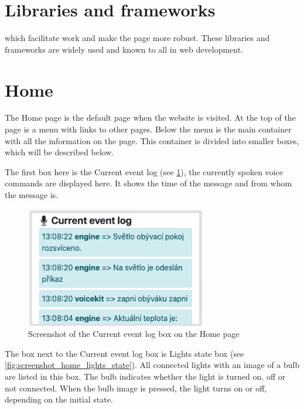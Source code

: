 \section{Libraries and frameworks} \label{section:libraries_and_frameworks}

which facilitate work and make the page more robust. These libraries and frameworks are widely used and known to all in web development. 


\section{Home}

The Home page is the default page when the website is visited. At the top of the page is a menu with links to other pages. Below the menu is the main container with all the information on the page. This container is divided into smaller boxes, which will be described below.


The first box here is the Current event log (see \cref{fig:screenshot_home_current_event_log}), the currently spoken voice commands are displayed here. It shows the time of the message and from whom the message is. 

\begin{figure}[H]
    \centering
    \includegraphics[width=0.7\textwidth]{img/screenshot_home_current_event_log.png}
    \caption{Screenshot of the Current event log box on the Home page}
    \label{fig:screenshot_home_current_event_log}
\end{figure}

The box next to the Current event log box is Lights state box (see \cref{fig:screenshot_home_lights_state}). All connected lights with an image of a bulb are listed in this box. The bulb indicates whether the light is turned on, off or not connected. When the bulb image is pressed, the light turns on or off, depending on the initial state.

